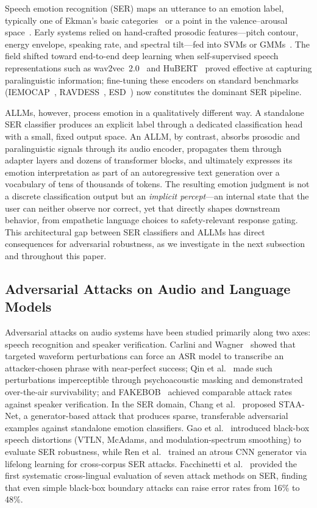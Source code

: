 Speech emotion recognition (SER) maps an utterance to an emotion label, typically one of Ekman's basic categories~\cite{ekman1992} or a point in the valence--arousal space~\cite{russell1980}.
Early systems relied on hand-crafted prosodic features---pitch contour, energy envelope, speaking rate, and spectral tilt---fed into SVMs or GMMs~\cite{schuller2009interspeech}.
The field shifted toward end-to-end deep learning when self-supervised speech representations such as wav2vec~2.0~\cite{wav2vec2} and HuBERT~\cite{hubert} proved effective at capturing paralinguistic information; fine-tuning these encoders on standard benchmarks (IEMOCAP~\cite{iemocap}, RAVDESS~\cite{ravdess}, ESD~\cite{esd}) now constitutes the dominant SER pipeline.

ALLMs, however, process emotion in a qualitatively different way.
A standalone SER classifier produces an explicit label through a dedicated classification head with a small, fixed output space.
An ALLM, by contrast, absorbs prosodic and paralinguistic signals through its audio encoder, propagates them through adapter layers and dozens of transformer blocks, and ultimately expresses its emotion interpretation as part of an autoregressive text generation over a vocabulary of tens of thousands of tokens.
The resulting emotion judgment is not a discrete classification output but an \emph{implicit percept}---an internal state that the user can neither observe nor correct, yet that directly shapes downstream behavior, from empathetic language choices to safety-relevant response gating.
This architectural gap between SER classifiers and ALLMs has direct consequences for adversarial robustness, as we investigate in the next subsection and throughout this paper.

\subsection{Adversarial Attacks on Audio and Language Models}
\label{sec:bg_adversarial}

Adversarial attacks on audio systems have been studied primarily along two axes: speech recognition and speaker verification.
Carlini and Wagner~\cite{carlini2018audio} showed that targeted waveform perturbations can force an ASR model to transcribe an attacker-chosen phrase with near-perfect success; Qin et al.~\cite{qin2019imperceptible} made such perturbations imperceptible through psychoacoustic masking and demonstrated over-the-air survivability; and FAKEBOB~\cite{fakebob} achieved comparable attack rates against speaker verification.
In the SER domain, Chang et al.~\cite{staanet} proposed STAA-Net, a generator-based attack that produces sparse, transferable adversarial examples against standalone emotion classifiers.
Gao et al.~\cite{gao2022} introduced black-box speech distortions (VTLN, McAdams, and modulation-spectrum smoothing) to evaluate SER robustness, while Ren et al.~\cite{ren2020} trained an atrous CNN generator via lifelong learning for cross-corpus SER attacks.
Facchinetti et al.~\cite{facchinetti2024} provided the first systematic cross-lingual evaluation of seven attack methods on SER, finding that even simple black-box boundary attacks can raise error rates from 16\% to 48\%.

